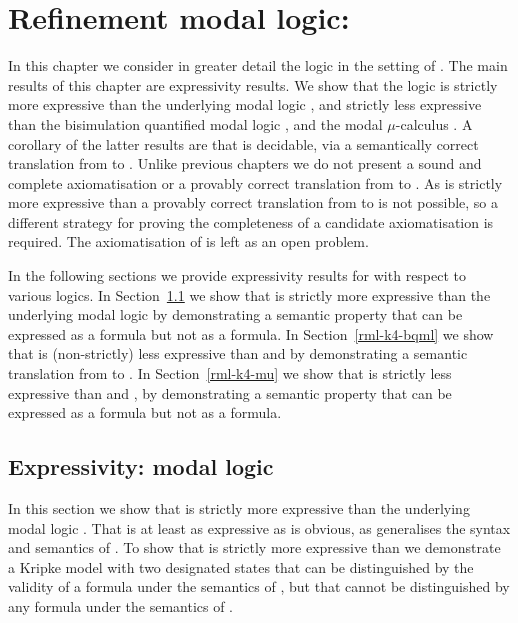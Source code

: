 \chapter{Refinement modal logic: \classKF{}}\label{rml-k4}

In this chapter we consider in greater detail the logic \logicRmlKF{} in the setting of \classKF{}.
The main results of this chapter are expressivity results.
We show that the logic \logicRmlKF{} is strictly more expressive than the underlying modal logic \logicKF{}, and strictly less expressive than the bisimulation quantified modal logic \logicBqmlKF{}, and the modal $\mu$-calculus \logicMuKF{}.
A corollary of the latter results are that \logicRmlKF{} is decidable, via a semantically correct translation from \langRml{} to \langBqml{}.
Unlike previous chapters we do not present a sound and complete axiomatisation or a provably correct translation from \langRml{} to \langMl{}.
As \logicRmlKF{} is strictly more expressive than \logicKF{} a provably correct translation from \langRml{} to \langMl{} is not possible, so a different strategy for proving the completeness of a candidate axiomatisation is required.
The axiomatisation of \logicRmlKF{} is left as an open problem.

In the following sections we provide expressivity results for \logicRmlKF{} with respect to various logics.
In Section~\ref{rml-k4-ml} we show that \logicRmlKF{} is strictly more expressive than the underlying modal logic \logicKF{} by demonstrating a semantic property that can be expressed as a \langRml{} formula but not as a \langMl{} formula.
In Section~\ref{rml-k4-bqml} we show that \logicRmlKF{} is (non-strictly) less expressive than \logicBqmlKF{} and \logicMuKF{} by demonstrating a semantic translation from \langRml{} to \langBqml{}.
In Section~\ref{rml-k4-mu} we show that \logicRmlKF{} is strictly less expressive than \logicMuKF{} and \logicBqmlKF{}, by demonstrating a semantic property that can be expressed as a \langMu{} formula but not as a \langRml{} formula.

\section{Expressivity: modal logic}\label{rml-k4-ml}

In this section we show that \logicRmlKF{} is strictly more expressive than the underlying modal logic \logicKF{}.
That \logicRmlKF{} is at least as expressive as \logicKF{} is obvious, as \logicRmlKF{} generalises the syntax and semantics of \logicKF{}.
To show that \logicRmlKF{} is strictly more expressive than \logicKF{} we demonstrate a \classKF{} Kripke model with two designated states that can be distinguished by the validity of a \langRml{} formula under the semantics of \logicRmlKF{}, but that cannot be distinguished by any \langMl{} formula under the semantics of \logicKF{}. 

